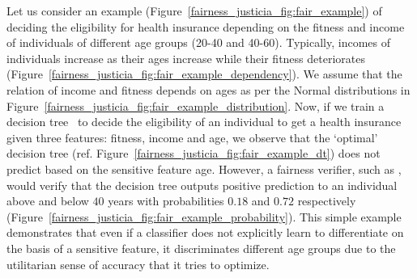 \begin{example}\label{fairness_justicia_example:intro}
	\normalfont
	Let us consider an example (Figure~\ref{fairness_justicia_fig:fair_example}) of deciding the eligibility for health insurance depending on the fitness and income of individuals of different age groups (20-40 and 40-60). Typically, incomes of individuals increase as their ages increase while their fitness deteriorates (Figure~\ref{fairness_justicia_fig:fair_example_dependency}). We assume that the relation of income and fitness depends on ages as per the Normal distributions in Figure~\ref{fairness_justicia_fig:fair_example_distribution}. Now, if we train a decision tree~\cite{narodytska2018learning} to decide the eligibility of an individual to get a health insurance given three features: fitness, income and age, we observe that the `optimal' decision tree (ref. Figure~\ref{fairness_justicia_fig:fair_example_dt}) does not predict based on the sensitive feature age. However, a fairness verifier, such as {\justicia}, would verify that the decision tree outputs positive prediction to an individual above and below $40$ years with probabilities $0.18$ and $0.72$ respectively (Figure~\ref{fairness_justicia_fig:fair_example_probability}). This simple example demonstrates that even if a classifier does not explicitly learn to differentiate on the basis of a sensitive feature, it discriminates different age groups due to the utilitarian sense of accuracy that it tries to optimize.
\end{example}

